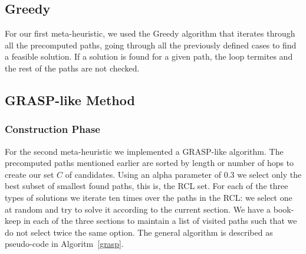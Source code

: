 \documentclass[11pt,a4paper]{article}
\begin{document}
\subsection{Greedy}
For our first meta-heuristic, we used the Greedy algorithm that iterates through all the precomputed paths, going through all the previously defined cases to find a feasible solution. If a solution is found for a given path, the loop termites and the rest of the paths are not checked.
 
\subsection{GRASP-like Method} 

\subsubsection{Construction Phase}

For the second meta-heuristic we implemented a GRASP-like algorithm. The precomputed paths mentioned earlier are sorted by length or number of hops to create our set $C$ of candidates. Using an alpha parameter of 0.3 we select only the best subset of smallest found paths, this is, the RCL set. For each of the three types of solutions we iterate ten times over the paths in the RCL: we select one at random and try to solve it according to the current section. We have a book-keep in each of the three sections to maintain a list of visited paths such that we do not select twice the same option. The general algorithm is described as pseudo-code in Algoritm~\ref{grasp}.\\
\end{document}
